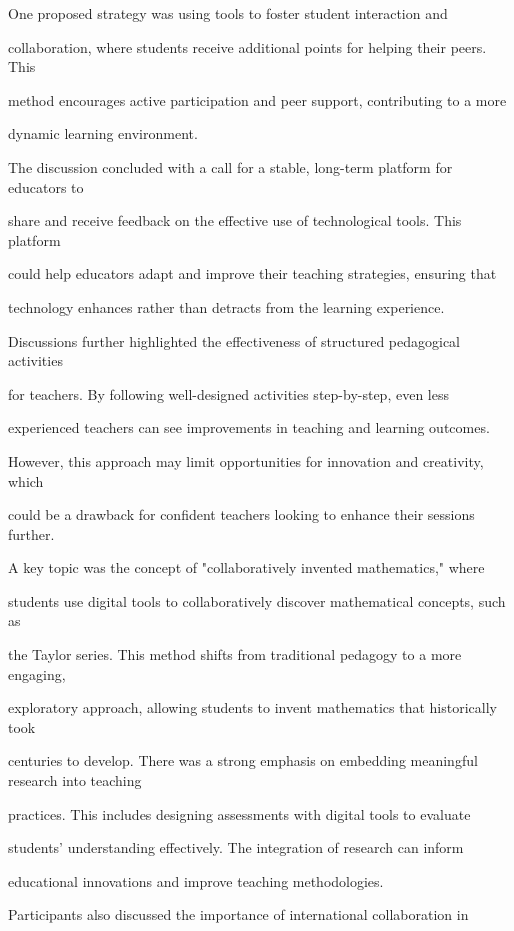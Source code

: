 \documentclass[11pt]{article}
\begin{document}
One proposed strategy was using tools to foster student interaction and

collaboration, where students receive additional points for helping their peers. This

method encourages active participation and peer support, contributing to a more

dynamic learning environment.

The discussion concluded with a call for a stable, long-term platform for educators to

share and receive feedback on the effective use of technological tools. This platform

could help educators adapt and improve their teaching strategies, ensuring that

technology enhances rather than detracts from the learning experience.

Discussions further highlighted the effectiveness of structured pedagogical activities

for teachers. By following well-designed activities step-by-step, even less

experienced teachers can see improvements in teaching and learning outcomes.

However, this approach may limit opportunities for innovation and creativity, which

could be a drawback for confident teachers looking to enhance their sessions further.

A key topic was the concept of "collaboratively invented mathematics," where

students use digital tools to collaboratively discover mathematical concepts, such as

the Taylor series. This method shifts from traditional pedagogy to a more engaging,

exploratory approach, allowing students to invent mathematics that historically took

centuries to develop. There was a strong emphasis on embedding meaningful research into teaching

practices. This includes designing assessments with digital tools to evaluate

students' understanding effectively. The integration of research can inform

educational innovations and improve teaching methodologies.

Participants also discussed the importance of international collaboration in
\end{document}
